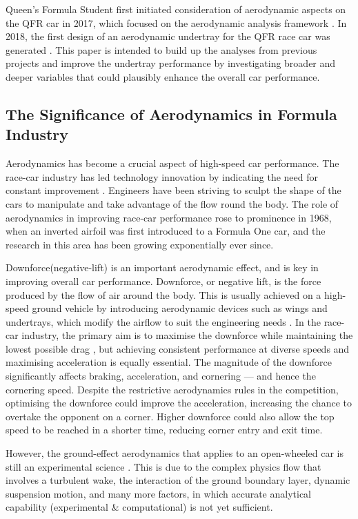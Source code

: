 \noindent Queen's Formula Student first initiated consideration of aerodynamic aspects on the QFR car in 2017, which focused on the aerodynamic analysis framework \cite{Corr2017MechanicalAuthor}. In 2018, the first design of an aerodynamic undertray for the QFR race car was generated \cite{McKeown2018DesignCar}. This paper is intended to build up the analyses from previous projects and improve the undertray performance by investigating broader and deeper variables that could plausibly enhance the overall car performance. 

\subsection{The Significance of Aerodynamics in Formula Industry}
Aerodynamics has become a crucial aspect of high-speed car performance. The race-car industry has led technology innovation by indicating the need for constant improvement \cite{Zhang2006GroundCars}. Engineers have been striving to sculpt the shape of the cars to manipulate and take advantage of the flow round the body. The role of aerodynamics in improving race-car performance rose to prominence in 1968, when an inverted airfoil was first introduced to a Formula One car, and the research in this area has been growing exponentially ever since.


\noindent Downforce(negative-lift) is an important aerodynamic effect, and is key in improving overall car performance. Downforce, or negative lift, is the force produced by the flow of air around the body. This is usually achieved on a high-speed ground vehicle by introducing aerodynamic devices such as wings and undertrays, which modify the airflow to suit the engineering needs \cite{Wright1982TheCars}. In the race-car industry, the primary aim is to maximise the downforce while maintaining the lowest possible drag \cite{Zhang2006GroundCars}, but achieving consistent performance at diverse speeds and maximising acceleration is equally essential. The magnitude of the downforce significantly affects braking, acceleration, and cornering --- and hence the cornering speed. Despite the restrictive aerodynamics rules in the competition, optimising the downforce could improve the acceleration, increasing the chance to overtake the opponent on a corner. Higher downforce could also allow the top speed to be reached in a shorter time, reducing corner entry and exit time. 

\noindent However, the ground-effect aerodynamics that applies to an open-wheeled car is still an experimental science \cite{Zhang2006GroundCars}. This is due to the complex physics flow that involves a turbulent wake, the interaction of the ground boundary layer, dynamic suspension motion, and many more factors, in which accurate analytical capability (experimental \& computational) is not yet sufficient.

